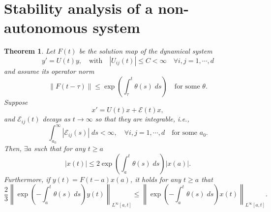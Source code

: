 \documentclass[a4paper,11pt]{article}
\newtheorem{theorem}{Theorem}
\theoremstyle{remark}
\begin{document}
\section{Stability analysis of a non-autonomous system}
\begin{theorem} \label{prop:stab}
 Let $F(t)$ be the solution map of the dynamical system
 $$ y' = U(t)y, \quad \text{with} \quad |U_{ij}(t)|\le C<\infty \quad \forall i,j=1,\cdots,d$$
 and assume its operator norm 
 $$\big\|F(t-\tau)\big\| \le \exp\left(\int_\tau^t \theta(s)\; ds\right) \quad \text{for some $\theta$.}$$
 Suppose
 \begin{equation}
x' = U(t)x + \mathcal{E}(t)x, \label{eq:x}
 \end{equation}
and $\mathcal{E}_{ij}(t)$ decays as $t \rightarrow \infty$ so that they are integrable, i.e.,
 $$ \int_{a_0}^\infty |\mathcal{E}_{ij}(s)| \; ds < \infty, \quad \forall i,j=1,\cdots,d \quad \text{for some $a_0$.}$$
 Then, $\exists a$ such that for any $t\ge a$
 $$ |x(t)| \le 2\exp\left(\int_a^t \theta(s)\; ds\right) |x(a)|.$$
 Furthermore, if $y(t)=F(t-a)x(a)$, it holds for any $t\ge a$ that
 $$\frac{2}{3}\left\|\exp\left(-\int_a^t \theta(s)\; ds\right)y(t)\right\|_{L^\infty[a,t]} \le  \left\|\exp\left(-\int_a^t \theta(s)\; ds\right)x(t)\right\|_{L^\infty[a,t]}.$$
%  
%  
\end{theorem}
\end{document}
